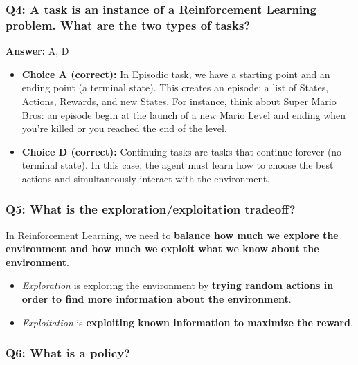 \documentclass[11pt,a4paper]{article}
\begin{document}
\subsubsection{Q4: A task is an instance of a Reinforcement Learning problem. What are the two types of tasks?}\label{q4-a-task-is-an-instance-of-a-reinforcement-learning-problem.-what-are-the-two-types-of-tasks-1}

\textbf{Answer:} A, D

\begin{itemize}
\item
  \textbf{Choice A (correct):} In Episodic task, we have a starting point and an ending point (a terminal state). This creates an episode: a list of States, Actions, Rewards, and new States. For instance, think about Super Mario Bros: an episode begin at the launch of a new Mario Level and ending when you're killed or you reached the end of the level.
\item
  \textbf{Choice D (correct):} Continuing tasks are tasks that continue forever (no terminal state). In this case, the agent must learn how to choose the best actions and simultaneously interact with the environment.
\end{itemize}

\subsubsection{Q5: What is the exploration/exploitation tradeoff?}\label{q5-what-is-the-explorationexploitation-tradeoff-1}

In Reinforcement Learning, we need to \textbf{balance how much we explore the environment and how much we exploit what we know about the environment}.

\begin{itemize}
\item
  \emph{Exploration} is exploring the environment by \textbf{trying random actions in order to find more information about the environment}.
\item
  \emph{Exploitation} is \textbf{exploiting known information to maximize the reward}.
\end{itemize}


\subsubsection{Q6: What is a policy?}\label{q6-what-is-a-policy-1}
\end{document}
